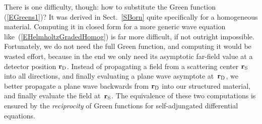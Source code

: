 There is one difficulty, though:
how to substitute the Green function (\ref{EGreens1})?
It was derived in Sect.~\ref{SBorn} quite specifically
for a homogeneous material.
Computing it in closed form for a more generic wave equation
like~(\ref{EHelmholtzGradedHomog}) is far more difficult,
if not outright impossible.
Fortunately, we do not need the full Green function,
and computing it would be wasted effort,
because in the end
we only need its asymptotic far-field value at a detector position $\mathbf{r}_\text{D}$.
Instead of propagating a field from a scattering center $\mathbf{r}_\text{S}$
into all directions, and finally evaluating a plane wave asymptote at~$\mathbf{r}_\text{D}$,
we better propagate a plane wave backwards from $\mathbf{r}_\text{D}$
into our structured material,
and finally evaluate the field at~$\mathbf{r}_\text{S}$.
The equivalence of these two computations is ensured
by the \textit{reciprocity}%
of Green functions for self-adjungated differential equations.


